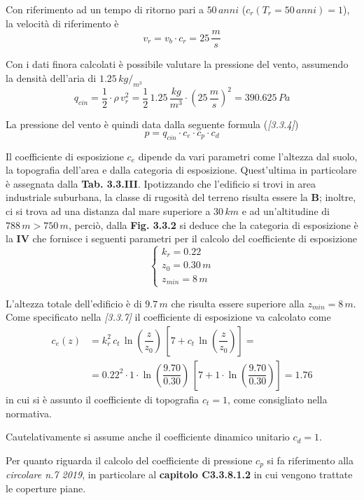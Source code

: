 Con riferimento ad un tempo di ritorno pari a $50\,anni$ ($c_r(T_r=50\,anni) = 1$), la velocità di riferimento è
\[
 v_r = v_b\cdot c_r = 25\,\dfrac{m}{s}
\]

Con i dati finora calcolati è possibile valutare la pressione del vento, assumendo la densità dell'aria di $1.25\,kg/_{m^3}$
\[
 q_{cin} = \dfrac{1}{2}\cdot\rho\, v_r^2 = \dfrac{1}{2}\,1.25\,\dfrac{kg}{m^3}\cdot\left(25\,\dfrac{m}{s}\right)^2 = 390.625\,Pa
\]

La pressione del vento è quindi data dalla seguente formula (\emph{[3.3.4]})
\[
 p = q_{cin}\cdot c_e\cdot c_p\cdot c_d
\]

Il coefficiente di esposizione $c_e$ dipende da vari parametri come l'altezza dal suolo, la topografia dell'area e dalla categoria di esposizione. Quest'ultima in particolare è assegnata dalla \textbf{Tab. 3.3.III}. Ipotizzando che l'edificio si trovi in area industriale suburbana, la classe di rugosità del terreno risulta essere la \textbf{B}; inoltre, ci si trova ad una distanza dal mare superiore a $30\,km$ e ad un'altitudine di $788\,m > 750\,m$, perciò, dalla \textbf{Fig. 3.3.2} si deduce che la categoria di esposizione è la \textbf{IV} che fornisce i seguenti parametri per il calcolo del coefficiente di esposizione
\begin{equation*}
 \begin{cases}
    k_r = 0.22\\
    z_0 = 0.30\,m\\
    z_{min} = 8\,m
 \end{cases}
\end{equation*}

L'altezza totale dell'edificio è di $9.7\,m$ che risulta essere superiore alla $z_{min} = 8\,m$. Come specificato nella \emph{[3.3.7]} il coefficiente di esposizione va calcolato come
\begin{align*}
 c_e(z) &= k_r^2 \, c_t\,\ln\left(\dfrac{z}{z_0}\right)\,\left[ 7 + c_t\,\ln\left(\dfrac{z}{z_0}\right)\right] = \\
 &= 0.22^2 \cdot 1\cdot \ln\left(\dfrac{9.70}{0.30}\right)\,\left[ 7 + 1\cdot\ln\left(\dfrac{9.70}{0.30}\right)\right] = 1.76
\end{align*}
in cui si è assunto il coefficiente di topografia $c_t = 1$, come consigliato nella normativa.

Cautelativamente si assume anche il coefficiente dinamico unitario $c_d = 1$.

Per quanto riguarda il calcolo del coefficiente di pressione $c_p$ si fa riferimento alla \emph{circolare n.7 2019}, in particolare al \textbf{capitolo C3.3.8.1.2} in cui vengono trattate le coperture piane.

